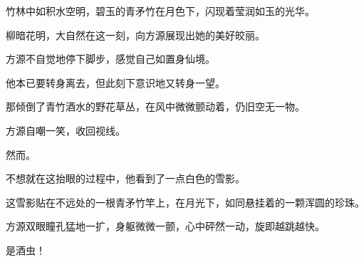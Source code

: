 \begin{this_body}
竹林中如积水空明，碧玉的青矛竹在月色下，闪现着莹润如玉的光华。

柳暗花明，大自然在这一刻，向方源展现出她的美好皎丽。

方源不自觉地停下脚步，感觉自己如置身仙境。

他本已要转身离去，但此刻下意识地又转身一望。

那倾倒了青竹酒水的野花草丛，在风中微微颤动着，仍旧空无一物。

方源自嘲一笑，收回视线。

然而。

不想就在这抬眼的过程中，他看到了一点白色的雪影。

这雪影贴在不远处的一根青矛竹竿上，在月光下，如同悬挂着的一颗浑圆的珍珠。

方源双眼瞳孔猛地一扩，身躯微微一颤，心中砰然一动，旋即越跳越快。

是酒虫！

\end{this_body}

